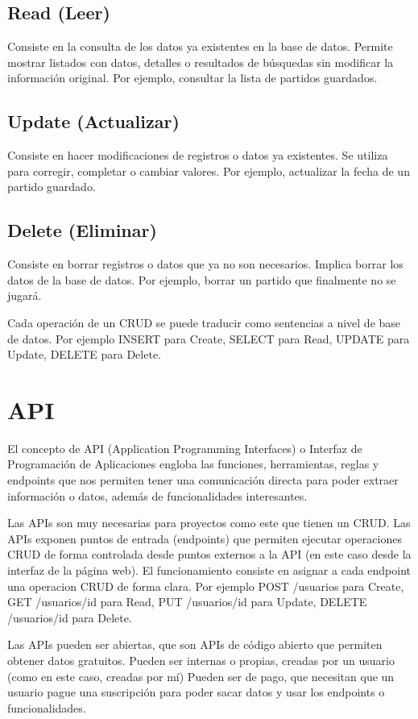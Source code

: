 \subsection{Read (Leer)}
Consiste en la consulta de los datos ya existentes en la base de datos. Permite mostrar listados con datos, detalles o resultados de búsquedas sin modificar la información original. Por ejemplo, consultar la lista de partidos guardados.

\subsection{Update (Actualizar)}
Consiste en hacer modificaciones de registros o datos ya existentes. Se utiliza para corregir, completar o cambiar valores. Por ejemplo, actualizar la fecha de un partido guardado.

\subsection{Delete (Eliminar)}
Consiste en borrar registros o datos que ya no son necesarios. Implica borrar los datos de la base de datos. Por ejemplo, borrar un partido que finalmente no se jugará.


Cada operación de un CRUD se puede traducir como sentencias a nivel de base de datos.
Por ejemplo INSERT para Create, SELECT para Read, UPDATE para Update, DELETE para Delete.
 


\section{API}
El concepto de API (Application Programming Interfaces) o Interfaz de Programación de Aplicaciones engloba las funciones, herramientas, reglas y endpoints que nos permiten tener una comunicación directa para poder extraer información o datos, además de funcionalidades interesantes.

Las APIs son muy necesarias para proyectos como este que tienen un CRUD. Las APIs exponen puntos de entrada (endpoints) que permiten ejecutar operaciones CRUD de forma controlada desde puntos externos a la API (en este caso desde la interfaz de la página web). El funcionamiento consiste en asignar a cada endpoint una operacion CRUD de forma clara. Por ejemplo POST /usuarios para Create, GET /usuarios/{id} para Read, PUT /usuarios/{id} para Update, DELETE /usuarios/{id} para Delete.

Las APIs pueden ser abiertas, que son APIs de código abierto que permiten obtener datos gratuitos. Pueden ser internas o propias, creadas por un usuario (como en este caso, creadas por mí) Pueden ser de pago, que necesitan que un usuario pague una suscripción para poder sacar datos y usar los endpoints o funcionalidades.


